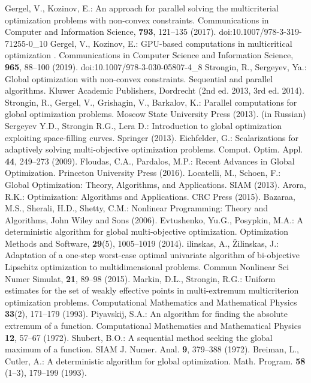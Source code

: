 \documentclass{svproc}
\providecommand{\doi}[1]{doi:\discretionary{}{}{}#1}
\begin{document}
\begin{thebibliography}{6}
Gergel, V., Kozinov, E.: An approach for parallel solving the multicriterial optimization problems with non-convex constraints. Communications in Computer and Information Science, \textbf{793}, 121--135 (2017). \doi{10.1007/978-3-319-71255-0\_10}
Gergel, V., Kozinov, E.: GPU-based computations in multicritical optimization . Communications in Computer Science and Information Science, \textbf{965}, 88--100 (2019). \doi{10.1007/978-3-030-05807-4\_8}
Strongin, R., Sergeyev, Ya.: Global optimization with non-convex constraints. Sequential and parallel algorithms. Kluwer Academic Publishers, Dordrecht (2nd ed. 2013, 3rd ed. 2014).
Strongin, R., Gergel, V., Grishagin, V., Barkalov, K.: Parallel computations for global optimization problems. Moscow State University Press (2013). (in Russian)
Sergeyev Y.D., Strongin R.G., Lera D.: Introduction to global optimization exploiting space-filling curves. Springer (2013).
Eichfelder, G.: Scalarizations for adaptively solving multi-objective optimization problems. Comput. Optim. Appl. \textbf{44}, 249--273 (2009). 
Floudas, C.A., Pardalos, M.P.: Recent Advances in Global Optimization. Princeton University Press (2016).
Locatelli, M., Schoen, F.: Global Optimization: Theory, Algorithms, and Applications. SIAM (2013).
Arora, R.K.: Optimization: Algorithms and Applications. CRC Press (2015).
Bazaraa, M.S., Sherali, H.D., Shetty, C.M.: Nonlinear Programming: Theory and Algorithms, John Wiley and Sons (2006).
Evtushenko, Yu.G., Posypkin, M.A.: A deterministic algorithm for global multi-objective optimization. Optimization Methods and Software, \textbf{29}(5), 1005--1019 (2014).
ilinskas, A., {\v Z}ilinskas, J.: Adaptation of a one-step worst-case optimal univariate algorithm of bi-objective Lipschitz optimization to multidimensional problems. Commun Nonlinear Sci Numer Simulat, \textbf{21}, 89--98 (2015).
Markin, D.L., Strongin, R.G.: Uniform estimates for the set of weakly effective points in multi-extremum multicriterion optimization problems. Computational Mathematics and Mathematical Physics \textbf{33}(2), 171--179 (1993).
Piyavskij, S.A.: An algorithm for finding the absolute extremum of a function. Computational Mathematics and Mathematical Physics \textbf{12}, 57--67 (1972).
Shubert, B.O.: A sequential method seeking the global maximum of a function. SIAM J. Numer. Anal. \textbf{9}, 379--388 (1972).
Breiman, L., Cutler, A.: A deterministic algorithm for global optimization. Math. Program. \textbf{58} (1--3), 179--199 (1993). 

\end{thebibliography}
\end{document}
